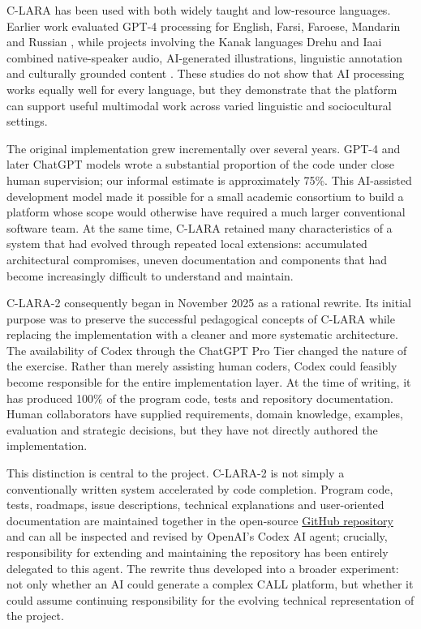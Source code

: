 \documentclass[11pt,a4paper]{article}
\begin{document}
C-LARA has been used with both widely taught and low-resource languages. Earlier work evaluated GPT-4 processing for English, Farsi, Faroese, Mandarin and Russian \citep{ChatGPTEtAl2023}, while projects involving the Kanak languages Drehu and Iaai combined native-speaker audio, AI-generated illustrations, linguistic annotation and culturally grounded content \citep{BaeEtAl2025,ChieraEtAl2025,WelbyEtAl2024}. These studies do not show that AI processing works equally well for every language, but they demonstrate that the platform can support useful multimodal work across varied linguistic and sociocultural settings.

The original implementation grew incrementally over several years. GPT-4 and later ChatGPT models wrote a substantial proportion of the code under close human supervision; our informal estimate is approximately 75\%. This AI-assisted development model made it possible for a small academic consortium to build a platform whose scope would otherwise have required a much larger conventional software team. At the same time, C-LARA retained many characteristics of a system that had evolved through repeated local extensions: accumulated architectural compromises, uneven documentation and components that had become increasingly difficult to understand and maintain.

C-LARA-2 consequently began in November 2025 as a rational rewrite. Its initial purpose was to preserve the successful pedagogical concepts of C-LARA while replacing the implementation with a cleaner and more systematic architecture. The availability of Codex through the ChatGPT Pro Tier changed the nature of the exercise. Rather than merely assisting human coders, Codex could feasibly become responsible for the entire implementation layer. At the time of writing, it has produced 100\% of the program code, tests and repository documentation. Human collaborators have supplied requirements, domain knowledge, examples, evaluation and strategic decisions, but they have not directly authored the implementation.

This distinction is central to the project. C-LARA-2 is not simply a conventionally written system accelerated by code completion. Program code, tests, roadmaps, issue descriptions, technical explanations and user-oriented documentation are maintained together in the open-source \href{https://github.com/mannyrayner/C-LARA-2}{GitHub repository} and can all be inspected and revised by OpenAI's Codex AI agent; crucially, responsibility for extending and maintaining the repository has been entirely delegated to this agent. The rewrite thus developed into a broader experiment: not only whether an AI could generate a complex CALL platform, but whether it could assume continuing responsibility for the evolving technical representation of the project.
\end{document}
